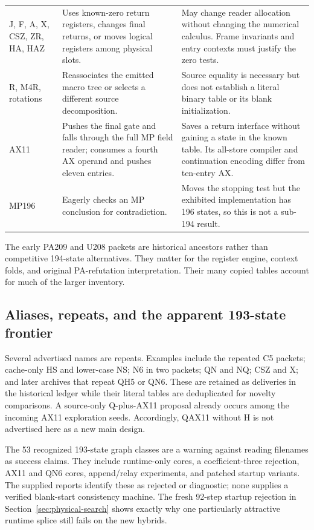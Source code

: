 \documentclass[11pt,a4paper]{article}
\begin{document}
\begin{longtable}{@{}p{}p{}p{}@{}}
J, F, A, X, CSZ, ZR, HA, HAZ & Uses known-zero return registers, changes final returns, or moves logical registers among physical slots. & May change reader allocation without changing the numerical calculus. Frame invariants and entry contexts must justify the zero tests.\\
R, M4R, rotations & Reassociates the emitted macro tree or selects a different source decomposition. & Source equality is necessary but does not establish a literal binary table or its blank initialization.\\
AX11 & Pushes the final gate and falls through the full MP field reader; consumes a fourth AX operand and pushes eleven entries. & Saves a return interface without gaining a state in the known table. Its all-store compiler and continuation encoding differ from ten-entry AX.\\
MP196 & Eagerly checks an MP conclusion for contradiction. & Moves the stopping test but the exhibited implementation has 196 states, so this is not a sub-194 result.\\
\bottomrule
\end{longtable}

The early PA209 and U208 packets are historical ancestors rather than
competitive 194-state alternatives. They matter for the register engine,
context folds, and original PA-refutation interpretation. Their many
copied tables account for much of the larger inventory.

\subsection{Aliases, repeats, and the apparent 193-state frontier}

Several advertised names are repeats. Examples include the repeated C5
packets; cache-only HS and lower-case NS; N6 in two packets; QN and NQ;
CSZ and X; and later archives that repeat QH5 or QN6. These are retained
as deliveries in the historical ledger while their literal tables are
deduplicated for novelty comparisons. A source-only Q-plus-AX11 proposal
already occurs among the incoming AX11 exploration seeds. Accordingly,
QAX11 without H is not advertised here as a new main design.

The 53 recognized 193-state graph classes are a warning against reading
filenames as success claims. They include runtime-only cores, a
coefficient-three rejection, AX11 and QN6 cores, append/relay experiments,
and patched startup variants. The supplied reports identify these as
rejected or diagnostic; none supplies a verified blank-start consistency
machine. The fresh 92-step startup rejection in
Section~\ref{sec:physical-search} shows exactly why one particularly
attractive runtime splice still fails on the new hybrids.
\end{document}
